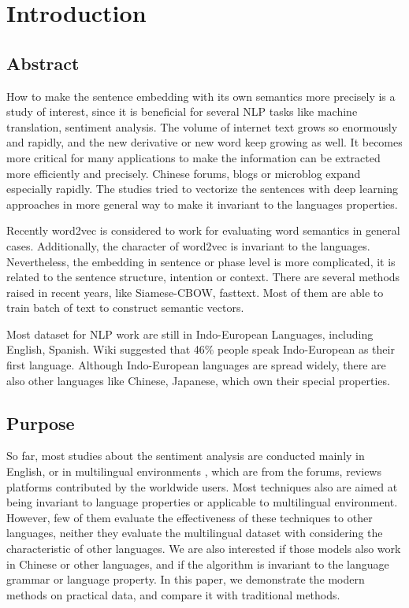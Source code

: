 \chapter{Introduction}
\setlength{\baselineskip}{1.5em}
\setlength{\parindent}{2em}
\setlength{\parskip}{1em}

\section{Abstract}

How to make the sentence embedding with its own semantics more precisely is a study of interest, since it is beneficial for several NLP tasks like machine translation, sentiment analysis. 
The volume of internet text grows so enormously and rapidly, and the new derivative or new word keep growing as well.
It becomes more critical for many applications to make the information can be extracted more efficiently and precisely.  
Chinese forums, blogs or microblog expand especially rapidly. The studies tried to vectorize the sentences with deep learning approaches in more general way to make it invariant to the languages properties.  


Recently word2vec\cite{word2vec} is considered to work for evaluating word semantics in general cases.  
Additionally, the character of word2vec is invariant to the languages. Nevertheless, 
the embedding in sentence or phase level is more complicated, it is related to the sentence structure,  
intention or context. There are several methods raised in recent years, like Siamese-CBOW, fasttext. 
Most of them are able to train batch of text to construct semantic vectors.

Most dataset for NLP work are still in Indo-European Languages, including English, Spanish. Wiki suggested that 46\% people speak Indo-European as their first language. 
Although Indo-European languages are spread widely, there are also other languages like Chinese, Japanese, which own their special properties.

\section{Purpose}

So far, most studies about the sentiment analysis are conducted mainly in English, or in multilingual environments
, which are from the forums, reviews platforms contributed by the worldwide users. Most techniques also are aimed at being invariant to language properties or applicable to multilingual environment. 
However, few of them evaluate the effectiveness of these techniques to other languages, neither they evaluate the multilingual dataset with considering the characteristic of other languages.   
We are also interested if those models also work in Chinese or other languages, and if the algorithm is invariant to the language grammar or language property. 
In this paper, we demonstrate the modern methods on practical data, and compare it with traditional methods.
